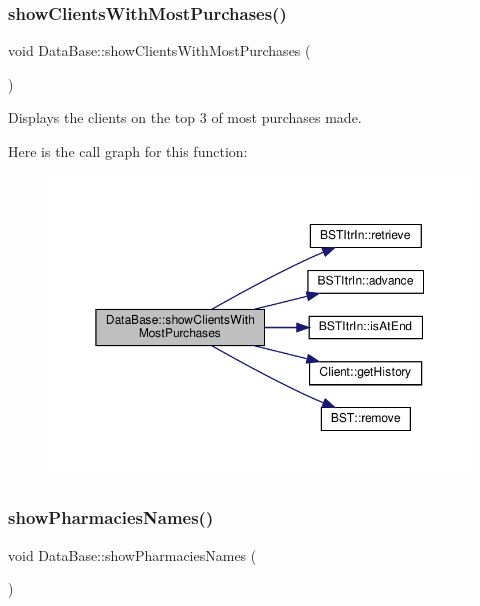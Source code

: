 \subsubsection{\texorpdfstring{show\+Clients\+With\+Most\+Purchases()}{showClientsWithMostPurchases()}}
{\footnotesize\ttfamily void Data\+Base\+::show\+Clients\+With\+Most\+Purchases (\begin{DoxyParamCaption}{ }\end{DoxyParamCaption})}



Displays the clients on the top 3 of most purchases made. 

Here is the call graph for this function\+:\nopagebreak
\begin{figure}[H]
\begin{center}
\leavevmode
\includegraphics[width=350pt]{classDataBase_ab87e9a50f26c934790774b0bf0d62a51_cgraph}
\end{center}
\end{figure}
\mbox{\label{classDataBase_ac572ac9a3091e0adcef16ab79bfba7fb}} 
\subsubsection{\texorpdfstring{show\+Pharmacies\+Names()}{showPharmaciesNames()}}
{\footnotesize\ttfamily void Data\+Base\+::show\+Pharmacies\+Names (\begin{DoxyParamCaption}{ }\end{DoxyParamCaption})}



